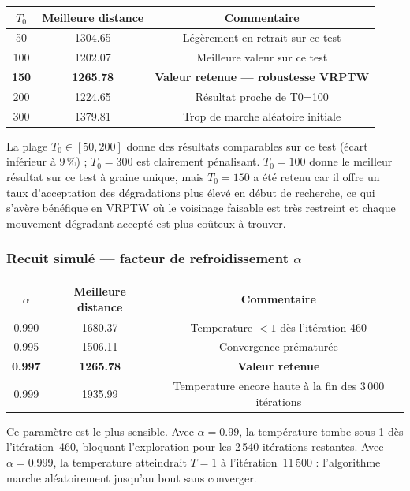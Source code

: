 \documentclass[11pt,a4paper]{article}
\begin{document}
\begin{center}
\begin{tabular}{ccc}
\toprule
\(T_0\) & Meilleure distance & Commentaire \\
\midrule
50  & 1304.65 & Légèrement en retrait sur ce test \\
100 & 1202.07 & Meilleure valeur sur ce test \\
\textbf{150} & \textbf{1265.78} & \textbf{Valeur retenue — robustesse VRPTW} \\
200 & 1224.65 & Résultat proche de T0=100 \\
300 & 1379.81 & Trop de marche aléatoire initiale \\
\bottomrule
\end{tabular}
\end{center}

La plage $T_0 \in [50, 200]$ donne des résultats comparables sur ce test (écart inférieur à $9\,\%$) ; $T_0=300$ est clairement pénalisant. $T_0=100$ donne le meilleur résultat sur ce test à graine unique, mais $T_0=150$ a été retenu car il offre un taux d'acceptation des dégradations plus élevé en début de recherche, ce qui s'avère bénéfique en VRPTW où le voisinage faisable est très restreint et chaque mouvement dégradant accepté est plus coûteux à trouver.

\subsubsection*{Recuit simulé — facteur de refroidissement \(\alpha\)}

\begin{center}
\begin{tabular}{ccc}
\toprule
\(\alpha\) & Meilleure distance & Commentaire \\
\midrule
0.990 & 1680.37 & Temperature $< 1$ dès l'itération 460 \\
0.995 & 1506.11 & Convergence prématurée \\
\textbf{0.997} & \textbf{1265.78} & \textbf{Valeur retenue} \\
0.999 & 1935.99 & Temperature encore haute à la fin des 3\,000 itérations \\
\bottomrule
\end{tabular}
\end{center}

Ce paramètre est le plus sensible. Avec $\alpha=0.99$, la température tombe sous 1 dès l'itération~460, bloquant l'exploration pour les 2\,540 itérations restantes. Avec $\alpha=0.999$, la temperature atteindrait $T=1$ à l'itération~11\,500 : l'algorithme marche aléatoirement jusqu'au bout sans converger.
\end{document}
